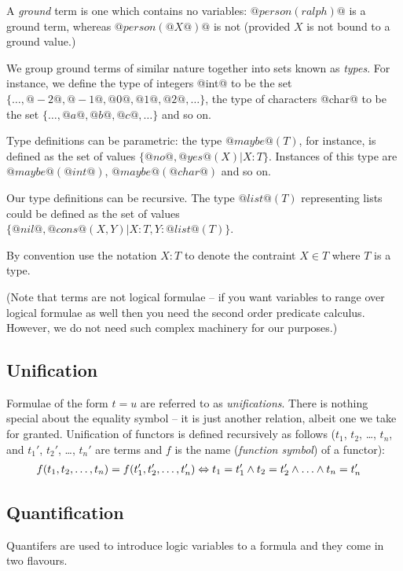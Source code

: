 A \emph{ground} term is one which contains no variables:
$@person(ralph)@$ is a ground term, whereas $@person(@X@)@$ is not
(provided $X$ is not bound to a ground value.)

We group ground terms of similar nature together into sets known as
\emph{types}.  For instance, we define the type of integers @int@ to
be the set $\{\ldots, @-2@, @-1@, @0@, @1@, @2@, \ldots\}$, the type of
characters @char@ to be the set $\{\ldots, @a@, @b@, @c@, \ldots\}$ and
so on.

Type definitions can be parametric: the type $@maybe@(T)$, for
instance, is defined as the set of values $\{@no@, @yes@(X) | X:T\}$.
Instances of this type are $@maybe@(@int@)$, $@maybe@(@char@)$ and so on.

Our type definitions can be recursive.  The type $@list@(T)$
representing lists could be defined as the set of values
$\{@nil@, @cons@(X, Y) | X:T, Y:@list@(T)\}$.

By convention use the notation $X:T$ to denote the contraint
$X \in T$ where $T$ is a type.

(Note that terms are not logical formulae -- if you want variables to
range over logical formulae as well then you need the second order
predicate calculus.  However, we do not need such complex machinery for
our purposes.)

\subsection{Unification}

Formulae of the form $t = u$ are referred to as \emph{unifications}.
There is nothing special about the equality symbol -- it is just another
relation, albeit one we take for granted.  Unification of functors is
defined recursively as follows ($t_1$, $t_2$, \ldots, $t_n$, and $t_1'$,
$t_2'$, \ldots, $t_n'$ are terms and $f$ is the name (\emph{function
symbol}) of a functor):
\begin{align*}
f(t_1, t_2, \ldots, t_n) = f(t_1', t_2', \ldots, t_n')
& \Leftrightarrow t_1 = t_1' \wedge t_2 = t_2' \wedge \ldots \wedge t_n = t_n'
\end{align*}

\subsection{Quantification}

Quantifers are used to introduce logic variables to a formula and they
come in two flavours.

